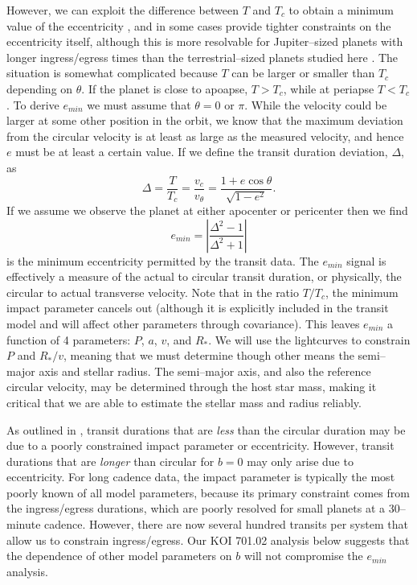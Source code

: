 However, we can exploit the difference between $T$ and $T_c$ to obtain
a minimum value of the eccentricity \citep{Barnes07}, and in some
cases provide tighter constraints on the eccentricity itself, although
this is more resolvable for Jupiter--sized planets with longer
ingress/egress times than the terrestrial--sized planets studied
here \citep{2012ApJ...756..122D}.  The situation is somewhat
complicated because $T$ can be larger or smaller than $T_c$ depending
on $\theta$. If the planet is close to apoapse, $T > T_c$, while at
periapse $T < T_c$. To derive $e_{min}$ we must assume that $\theta =
0$ or $\pi$. While the velocity could be larger at some other position
in the orbit, we know that the maximum deviation from the circular
velocity is at least as large as the measured velocity, and hence $e$
must be at least a certain value. If we define the transit duration
deviation, $\Delta$, as
\begin{equation}\label{eq:tdd}
\Delta = \frac{T}{T_c} = \frac{v_c}{v_\theta}  = \frac{1+e\cos\theta}{\sqrt{1-e^2}}.
\end{equation}
If we assume we observe the planet at either apocenter or pericenter then we find
\begin{equation}\label{eq:emin}
e_{min} = \left|\frac{\Delta^2 - 1}{\Delta^2 + 1}\right|
\end{equation}
is the minimum eccentricity permitted by the transit data.  The
$e_{min}$ signal is effectively a measure of the actual to circular
transit duration, or physically, the circular to actual transverse
velocity.  Note that in the ratio $T/T_c$, the minimum impact
parameter cancels out (although it is explicitly included in the
transit model and will affect other parameters through covariance).
This leaves $e_{min}$ a function of 4 parameters: $P$, $a$, $v$, and
$R_*$.  We will use the \kepler lightcurves to constrain $P$ and
$R_*/v$, meaning that we must determine though other means the
semi--major axis and stellar radius.  The semi--major axis, and also
the reference circular velocity, may be determined through the host
star mass, making it critical that we are able to estimate the stellar
mass and radius reliably.

As outlined in \cite{2008ApJ...678.1407F}, transit durations that are
{\it less} than the circular duration may be due to a poorly
constrained impact parameter or eccentricity.  However, transit
durations that are {\it longer} than circular for $b=0$ may only arise due to
eccentricity.  For long cadence \kepler data, the impact parameter is
typically the most poorly known of all model parameters, because its
primary constraint comes from the ingress/egress durations, which are
poorly resolved for small planets at a 30--minute cadence.  However,
there are now several hundred transits per system that allow us to constrain
ingress/egress.  Our KOI 701.02 analysis below suggests that the
dependence of other model parameters on $b$ will not compromise the
$e_{min}$ analysis.

